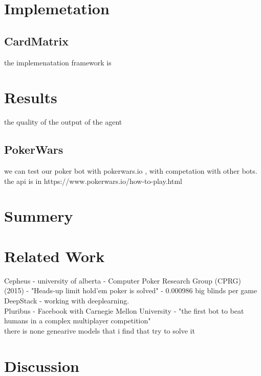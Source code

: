 \documentclass{article}
\begin{document}
\section{Implemetation}
\subsection{CardMatrix}
the implemenatation framework is
\section{Results}
the quality of the output of the agent
\subsection{PokerWars}
we can test our poker bot with pokerwars.io , with competation with other bots.
the api is in https://www.pokerwars.io/how-to-play.html
\section{Summery}
\section{Related Work}
Cepheus   - university of alberta -  Computer Poker Research Group (CPRG) (2015) - "Heads-up limit hold’em poker is solved" - 0.000986 big blinds per game \\
DeepStack - working with deeplearning.\\
Pluribus - Facebook with Carnegie Mellon University -  "the first bot to beat humans in a complex multiplayer competition"\\
there is none genearive models that i find that try to solve it
\section{Discussion}
\end{document}
